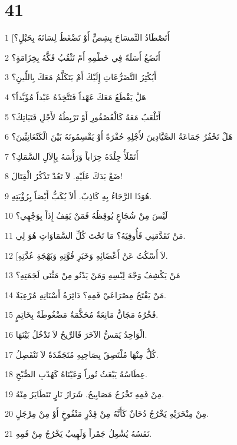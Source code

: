\chapter{41}

\par 1 [أَتَصْطَادُ التِّمسَاحَ بِشِصٍّ أَوْ تَضْغَطُ لِسَانَهُ بِحَبْلٍ؟
\par 2 أَتَضَعُ أَسَلَةً فِي خَطْمِهِ أَمْ تَثْقُبُ فَكَّهُ بِخِزَامَةٍ؟
\par 3 أَيُكْثِرُ التَّضَرُّعَاتِ إِلَيْكَ أَمْ يَتَكَلَّمُ مَعَكَ بِاللِّينِ؟
\par 4 هَلْ يَقْطَعُ مَعَكَ عَهْداً فَتَتَّخِذَهُ عَبْداً مُؤَبَّداً؟
\par 5 أَتَلْعَبُ مَعَهُ كَالْعُصْفُورِ أَوْ تَرْبِطُهُ لأَجْلِ فَتَيَاتِكَ؟
\par 6 هَلْ تَحْفُرُ جَمَاعَةُ الصَّيَّادِينَ لأَجْلِهِ حُفْرَةً أَوْ يَقْسِمُونَهُ بَيْنَ الْكَنْعَانِيِّينَ؟
\par 7 أَتَمْلَأُ جِلْدَهُ حِرَاباً وَرَأْسَهُ بِإِلاَلِ السَّمَكِ؟
\par 8 ضَعْ يَدَكَ عَلَيْهِ. لاَ تَعُدْ تَذْكُرُ الْقِتَالَ!
\par 9 هُوَذَا الرَّجَاءُ بِهِ كَاذِبٌ. أَلاَ يُكَبُّ أَيْضاً بِرُؤْيَتِهِ.
\par 10 لَيْسَ مِنْ شُجَاعٍ يُوقِظُهُ فَمَنْ يَقِفُ إِذاً بِوَجْهِي؟
\par 11 مَنْ تَقَدَّمَنِي فَأُوفِيَهُ؟ مَا تَحْتَ كُلِّ السَّمَاوَاتِ هُوَ لِي.
\par 12 [لاَ أَسْكُتُ عَنْ أَعْضَائِهِ وَخَبَرِ قُوَّتِهِ وَبَهْجَةِ عُدَّتِهِ.
\par 13 مَنْ يَكْشِفُ وَجْهَ لِبْسِهِ وَمَنْ يَدْنُو مِنْ مَثْنَى لَجَمَتِهِ؟
\par 14 مَنْ يَفْتَحُ مِصْرَاعَيْ فَمِهِ؟ دَائِرَةُ أَسْنَانِهِ مُرْعِبَةٌ.
\par 15 فَخْرُهُ مَجَانُّ مَانِعَةٌ مُحَكَّمَةٌ مَضْغُوطَةٌ بِخَاتِمٍ.
\par 16 الْوَاحِدُ يَمَسُّ الآخَرَ فَالرِّيحُ لاَ تَدْخُلُ بَيْنَهَا.
\par 17 كُلٌّ مِنْهَا مُلْتَصِقٌ بِصَاحِبِهِ مُتَجَمِّدَةً لاَ تَنْفَصِلُ.
\par 18 عِطَاسُهُ يَبْعَثُ نُوراً وَعَيْنَاهُ كَهُدْبِ الصُّبْحِ.
\par 19 مِنْ فَمِهِ تَخْرُجُ مَصَابِيحُ. شَرَارُ نَارٍ تَتَطَايَرُ مِنْهُ.
\par 20 مِنْ مِنْخَرَيْهِ يَخْرُجُ دُخَانٌ كَأَنَّهُ مِنْ قِدْرٍ مَنْفُوخٍ أَوْ مِنْ مِرْجَلٍ.
\par 21 نَفَسُهُ يُشْعِلُ جَمْراً وَلَهِيبٌ يَخْرُجُ مِنْ فَمِهِ.
